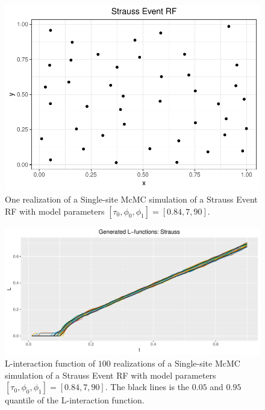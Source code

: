 \begin{figure}
    \centering
    \includegraphics[scale=0.95]{figures/repulsive_event_rf.pdf}
    \caption{One realization of a Single-site McMC simulation of a Strauss Event RF with model parameters $[\tau_0,\phi_0,\phi_1] = [0.84,7,90]$.}
    \label{fig:repulsive_event_rf}
\end{figure}

\begin{figure}
    \centering
    \includegraphics[scale=0.65]{figures/gen_strauss_l.pdf}
    \caption{L-interaction function of $100$ realizations of a Single-site McMC simulation of a Strauss Event RF with model parameters $[\tau_0,\phi_0,\phi_1] = [0.84,7,90]$. The black lines is the $0.05$ and $0.95$ quantile of the L-interaction function.}
    \label{fig:gen_strauss_l}
\end{figure}

